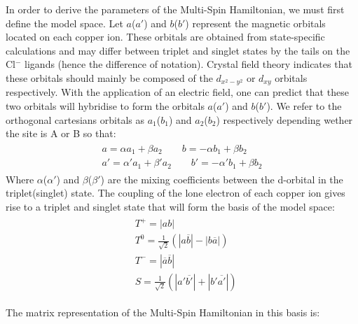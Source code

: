 \documentclass[12pt,a4paper]{report}
\numberwithin{equation}{section}
\begin{document}
In order to derive the parameters of the Multi-Spin Hamiltonian, we must first define the model space.
Let $a$($a'$) and $b$($b'$) represent the magnetic orbitals located on each copper ion. These orbitals are obtained from state-specific calculations and may differ between triplet and singlet states by the tails on the Cl$^-$ ligands (hence the difference of notation).
Crystal field theory indicates that these orbitals should mainly be composed of the $d_{x^2-y^2}$ or $d_{xy}$ orbitals respectively.
With the application of an electric field, one can predict that these two orbitals will hybridise to form the orbitals $a$($a'$) and $b$($b'$).
We refer to the orthogonal cartesians orbitals as $a_1$($b_1$) and $a_2$($b_2$) respectively depending wether the site is A or B so that:
\begin{align}
    \begin{split}
    a=\alpha a_1 + \beta a_2 \qquad b=-\alpha b_1  + \beta b_2 \\
    a'= \alpha ' a_1 +\beta ' a_2 \qquad b'=-\alpha' b_1 +\beta b_2
    \end{split}
\end{align}
Where $\alpha$($\alpha'$) and $\beta$($\beta'$) are the mixing coefficients between the d-orbital in the triplet(singlet) state.
The coupling of the lone electron of each copper ion gives rise to a triplet and singlet state that will form the basis of the model space:
\begin{align}
    \begin{split}
    &T^+=|ab|\\
    &T^0=\frac{1}{\sqrt{2}}(|a\overline{b}|-|b\overline{a}|)\\
    &T^-=|\overline{a}\overline{b}|\\
    &S=\frac{1}{\sqrt{2}}(|a'\overline{b'}|+|b'\overline{a'}|)
    \end{split}
\end{align}

The matrix representation of the Multi-Spin Hamiltonian in this basis is:
\end{document}
